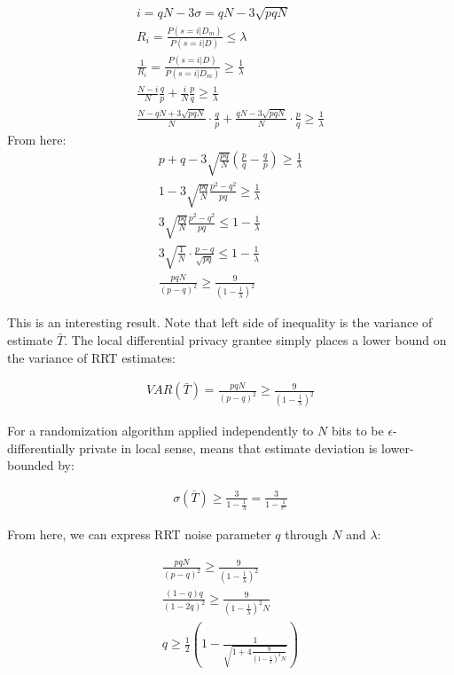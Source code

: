 \documentclass[11pt,draft]{article}
\begin{document}
\begin{align}
i = qN - 3\sigma = qN - 3\sqrt{pqN} \\
R_i = \frac{P(s=i | D_m)}{P(s=i | D)} \le \lambda \\
\frac{1}{R_i} = \frac{P(s=i | D)}{P(s=i | D_m)} \ge \frac{1}{ \lambda} \\
\frac{N-i}{N}\frac{q}{p} + \frac{i}{N} \frac{p}{q} \ge  \frac{1}{ \lambda}  \\
\frac{N-qN + 3\sqrt{pqN}}{N} \cdot \frac{q}{p} + \frac{qN - 3\sqrt{pqN}}{N} \cdot \frac{p}{q} \ge  \frac{1}{ \lambda}
\end{align}
From here:
\begin{align}
p + q  -  3\sqrt{\frac{pq}{N}} \left ( \frac{p}{q}  - \frac{q}{p} \right ) \ge  \frac{1}{ \lambda} \\
1 -  3\sqrt{\frac{pq}{N}} \frac{p^2 - q^2}{pq}  \ge  \frac{1}{ \lambda}\\
 3\sqrt{\frac{pq}{N}} \frac{p^2 - q^2}{pq}  \le  1 - \frac{1}{ \lambda}\\
 3\sqrt{\frac{1}{N}}  \cdot \frac{p - q}{\sqrt{pq}} \le  1 - \frac{1}{ \lambda} \\
\frac{pqN}{(p-q)^2} \ge \frac{9}{(1 - \frac{1}{\lambda} )^2}
\end{align}

This is an interesting result. Note that left side of inequality is the variance of estimate $\bar{T}$.  The local differential privacy grantee simply places a lower bound on the variance of RRT estimates:

\begin{align}
VAR(\bar{T}) = \frac{pqN}{(p-q)^2} \ge \frac{9}{(1 - \frac{1}{\lambda} )^2}
\end{align}

For a randomization algorithm applied independently to $N$ bits to be $\epsilon$-differentially private in local sense, means that estimate deviation is lower-bounded by:

\begin{align}
\sigma(\bar{T})  \ge \frac{3}{1 - \frac{1}{\lambda} } =  \frac{3}{1 - \frac{1}{e^{\epsilon}} }
\end{align}

From here, we can express RRT noise parameter $q$ through $N$ and $\lambda$:

\begin{align}
 \frac{pqN}{(p-q)^2} \ge \frac{9}{(1 - \frac{1}{\lambda})^2} \\
 \frac{(1-q)q}{(1-2q)^2} \ge \frac{9}{(1 - \frac{1}{\lambda})^2N} \\
q \ge \frac{1}{2} \left (1 -  \frac{1}{\sqrt{ 1 + 4 \frac{9}{(1 - \frac{1}{\lambda})^2N} } } \right ) 
\end{align}
\end{document}
